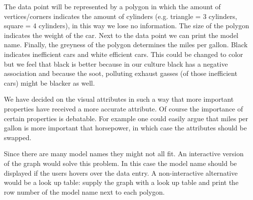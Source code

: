 \documentclass{article}[9pt]
\begin{document}
The data point will be represented by a polygon in which the amount of
vertices/corners indicates the amount of cylinders (e.g. triangle = 3 cylinders,
square = 4 cylinders), in this way we lose no information. The size of the
polygon indicates the weight of the car.
Next to the data point we can print the model name.
Finally, the greyness of the polygon determines the miles per gallon. Black
indicates inefficient cars and white efficient cars. This could be changed to
color but we feel that black is better because in our culture black has a
negative association and because the soot, polluting exhaust gasses
(of those inefficient cars) might be blacker as well.

We have decided on the visual attributes in such a way that more important
properties have received a more accurate attribute. Of course the importance of
certain properties is debatable. For example one could easily argue that
miles per gallon is more important that horsepower, in which case the attributes
should be swapped.

Since there are many model names they might not all fit. An interactive version
of the graph would solve this problem. In this case the model name should be
displayed if the users hovers over the data entry. A non-interactive
alternative would be a look up table: supply the graph with a look up table and
print the row number of the model name next to each polygon.

\vspace{-0.3cm}
\end{document}
